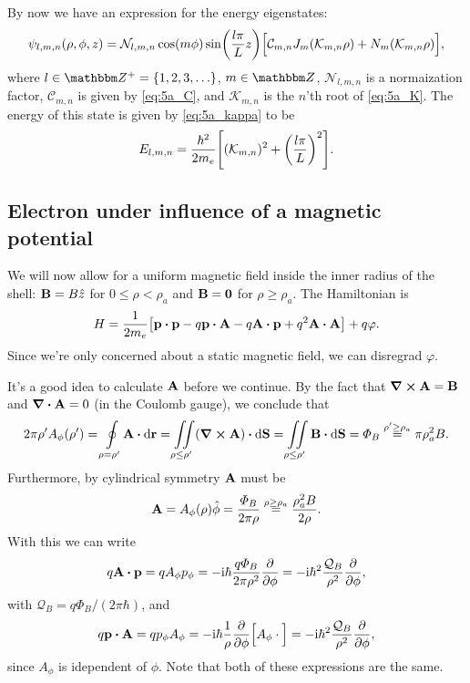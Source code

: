 \documentclass[11pt,letter, swedish, english
]{article}
\begin{document}
By now we have an expression for the energy eigenstates:
\begin{equation}
\psi_{l,m,n}(\rho, \phi, z)=
\mathcal{N}_{l,m,n}\cos(m\phi)\sin(\frac{l\pi}{L}z)
\Big[\mathcal{C}_{m,n}J_m\qty(\mathcal{K}_{m,n}\rho)+
N_m\qty(\mathcal{K}_{m,n}\rho) \Big],
\end{equation}
where $l\in\Z^+=\{1, 2, 3,\ldots\}$, $m\in\Z$, $\mathcal{N}_{l,m,n}$
is a normaization factor,  $\mathcal{C}_{m,n}$ is given by
\eqref{eq:5a_C}, and $\mathcal{K}_{m,n}$ is the $n$'th root of
\eqref{eq:5a_K}. The energy of this state is given by
\eqref{eq:5a_kappa} to be
\begin{equation}
E_{l,m,n}=\frac{\hbar^2}{2m_e}\qty[(\mathcal{K}_{m,n})^2 + \qty(\frac{l\pi}{L})^2].
\end{equation}




\subsection{Electron under influence of a magnetic potential}
\newcommand{\q}{\ensuremath{\mathcal{Q}_B}}
We will now allow for a uniform magnetic field inside the inner radius of
the shell: $\vb{B}=B\hat{z}$ for $0\le\rho<\rho_a$ and $\vb{B}=\vb{0}$
for $\rho\ge\rho_a$. The Hamiltonian is 
\begin{equation}
H=\frac{1}{2m_e}\qty[\vb{p}\vdot\vb{p}
-q\vb{p}\vdot\vb{A}-q\vb{A}\vdot\vb{p}+q^2\vb{A}\vdot\vb{A}] 
+ q\varphi.
\end{equation}
Since we're only concerned about a static magnetic field, we can
disregrad $\varphi$.

It's a good idea to calculate $\vb{A}$ before we continue. By the
fact that $\curl{\vb{A}}=\vb{B}$ and
$\div\vb{A}=0$ (in the Coulomb gauge), we conclude that
\begin{equation}
2\pi\rho' A_\phi(\rho')=\oint\limits_{\rho=\rho'}\!\vb{A}\vdot\rd{\vb{r}}
=\iint\limits_{\rho\le\rho'}(\curl\vb{A})\vdot\rd\vb{S}
=\iint\limits_{\rho\le\rho'}\vb{B}\vdot\rd\vb{S}
=\varPhi_B\stackrel{\rho'\ge\rho_a}{=}\pi\rho_a^2B.
\end{equation}
Furthermore, by cylindrical symmetry $\vb{A}$ must be
\begin{equation}
\vb{A}=A_\phi(\rho)\hat\phi=\frac{\varPhi_B}{2\pi\rho}
\stackrel{\rho\ge\rho_a}{=}\frac{\rho_a^2B}{2\rho}.
\end{equation}
With this we can write
\begin{equation}
q\vb{A}\vdot\vb{p}= qA_\phi p_\phi
=-\ii\hbar\frac{q\varPhi_B}{2\pi\rho^2}\pdv{\phi}
=-\ii\hbar^2\frac{\q}{\rho^2}\pdv{\phi},
\end{equation}
with $\q=q\varPhi_B/(2\pi\hbar)$, and
\begin{equation}
q\vb{p}\vdot\vb{A}=qp_\phi A_\phi 
= -\ii\hbar\frac{1}{\rho}\pdv{\phi}\Big[A_\phi\cdot\Big]
=-\ii\hbar^2\frac{\q}{\rho^2}\pdv{\phi},
\end{equation}
since $A_\phi$ is idependent of $\phi$.
Note that both of these expressions are the same.
\end{document}
